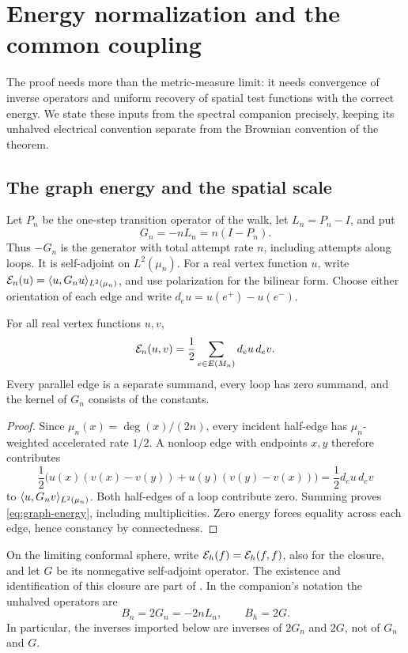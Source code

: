 \section{Energy normalization and the common coupling}\label{sec:inputs}

The proof needs more than the metric-measure limit: it needs convergence of
inverse operators and uniform recovery of spatial test functions with the
correct energy.  We state these inputs from the spectral companion
\cite{SC} precisely, keeping its unhalved electrical convention separate
from the Brownian convention of the theorem.

\subsection{The graph energy and the spatial scale}

Let \(P_n\) be the one-step transition operator of the walk, let
\(L_n=P_n-I\), and put
\[
 G_n=-nL_n=n(I-P_n).
\]
Thus \(-G_n\) is the generator with total attempt rate \(n\), including
attempts along loops.  It is self-adjoint on \(L^2(\mu_n)\).  For a real
vertex function \(u\), write
\(\mathcal E_n(u)=\langle u,G_nu\rangle_{L^2(\mu_n)}\), and use polarization for the
bilinear form.  Choose either orientation of each edge and write
\(d_eu=u(e^+)-u(e^-)\).

\begin{lemma}\label{lem:graph-energy}
For all real vertex functions \(u,v\),
\begin{equation}\label{eq:graph-energy}
 \mathcal E_n(u,v)=\frac12\sum_{e\in E(M_n)}d_eu\,d_ev.
\end{equation}
Every parallel edge is a separate summand, every loop has zero summand,
and the kernel of \(G_n\) consists of the constants.
\end{lemma}

\begin{proof}
Since \(\mu_n(x)=\deg(x)/(2n)\), every incident half-edge has
\(\mu_n\)-weighted accelerated rate \(1/2\).  A nonloop edge with
endpoints \(x,y\) therefore contributes
\[
 \frac12\bigl(u(x)(v(x)-v(y))+u(y)(v(y)-v(x))\bigr)
 =\frac12d_eu\,d_ev
\]
to \(\langle u,G_nv\rangle_{L^2(\mu_n)}\).  Both half-edges of a loop contribute
zero.  Summing proves \eqref{eq:graph-energy}, including multiplicities.
Zero energy forces equality across each edge, hence constancy by
connectedness.
\end{proof}

On the limiting conformal sphere, write \(\mathcal E_h(f)=\mathcal E_h(f,f)\), also for
the closure, and let \(G\) be its nonnegative self-adjoint operator.  The
existence and identification of this closure are part of
\cite[Proposition~8.3]{SC}.  In the companion's notation the unhalved
operators are
\begin{equation}\label{eq:raw-operators}
 B_n=2G_n=-2nL_n,\qquad B_h=2G.
\end{equation}
In particular, the inverses imported below are inverses of \(2G_n\) and
\(2G\), not of \(G_n\) and \(G\).

